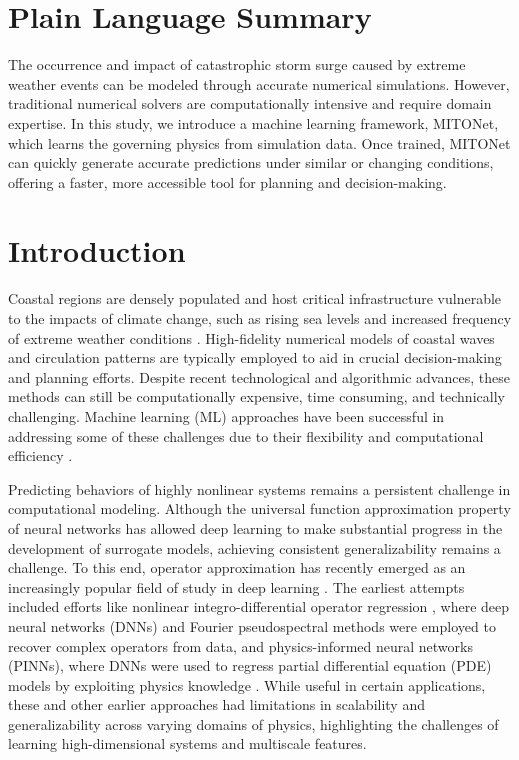 \documentclass[draft]{agujournal2019}
\begin{document}
\section*{Plain Language Summary}
The occurrence and impact of catastrophic storm surge caused by extreme weather events can be modeled through accurate numerical simulations. However, traditional numerical solvers are computationally intensive and require domain expertise. In this study, we introduce a machine learning framework, MITONet, which learns the governing physics from simulation data. Once trained, MITONet can quickly generate accurate predictions under similar or changing conditions, offering a faster, more accessible tool for planning and decision-making.

\section{Introduction}

Coastal regions are densely populated and host critical infrastructure vulnerable to the impacts of climate change, such as rising sea levels and increased frequency of extreme weather conditions \cite{oppenheimer2019sea}. High-fidelity numerical models of coastal waves and circulation patterns are typically employed to aid in crucial decision-making and planning efforts. Despite recent technological and algorithmic advances, these methods can still be computationally expensive, time consuming, and technically challenging. Machine learning (ML) approaches have been successful in addressing some of these challenges due to their flexibility and computational efficiency \cite{abouhalima2024machine, giaremis2024storm, karim2023review,  pachev2023framework}. 

Predicting behaviors of highly nonlinear systems remains a persistent challenge in computational modeling. Although the universal function approximation property of neural networks has allowed deep learning to make substantial progress in the development of surrogate models, achieving consistent generalizability remains a challenge. To this end, operator approximation has recently emerged as an increasingly popular field of study in deep learning \cite{azizzadenesheli2024neural}. The earliest attempts included efforts like nonlinear integro-differential operator regression \cite{patel2018nonlinear}, where deep neural networks (DNNs) and Fourier pseudospectral methods were employed to recover complex operators from data, and physics-informed neural networks (PINNs), where DNNs were used to regress partial differential equation (PDE) models by exploiting physics knowledge \cite{raissi2019physics}. While useful in certain applications, these and other earlier approaches had limitations in scalability and generalizability across varying domains of physics, highlighting the challenges of learning high-dimensional systems and multiscale features.
\end{document}
